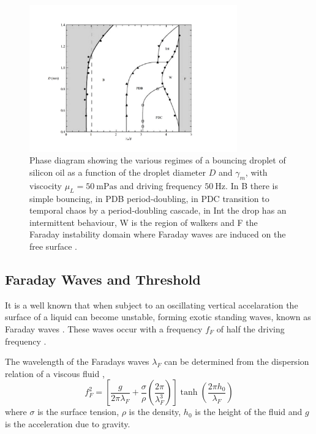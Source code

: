 \documentclass[11pt,twocolumn]{article}
\begin{document}
\begin{figure}[t]
    \centering
    \includegraphics[trim={25mm 15mm 25mm 15mm},clip,width=0.8\textwidth]{PhaseDiagram.pdf}
    \caption{Phase diagram showing the various regimes of a bouncing droplet of silicon oil as a function of the droplet diameter $D$ and $\gamma_m$, with viscocity $\mu_L=\SI{50}{\milli\pascal\second}$ and driving frequency $\SI{50}{\hertz}$.  In B there is simple bouncing, in PDB period-doubling, in PDC transition to temporal chaos by a period-doubling cascade, in Int the drop has an intermittent behaviour, W is the region of walkers and F the Faraday instability domain where Faraday waves are induced on the free surface \cite{9}.}
    \label{figphasediagram}
    \end{figure}


\subsection{Faraday Waves and Threshold}
\label{secfaradaywavesandthreshold}

It is a well known that when subject to an oscillating vertical accelaration the surface of a liquid can become unstable, forming exotic standing waves, known as Faraday waves \cite{20}.  These waves occur with a frequency $f_F$ of half the driving frequency \cite{15}.

The wavelength of the Faradays waves $\lambda_F$ can be determined from the dispersion relation of a viscous fluid \cite{8},
\begin{equation}
    \label{disp_rel}
    f_F^2=\left[\frac{g}{2\pi\lambda_F}+\frac{\sigma}{\rho}\left(\frac{2\pi}{\lambda_F^3}\right)\right]\tanh\left(\frac{2\pi h_0}{\lambda_F}\right)
\end{equation}
where $\sigma$ is the surface tension, $\rho$ is the density, $h_0$ is the height of the fluid and $g$ is the acceleration due to gravity.  %
\end{document}
